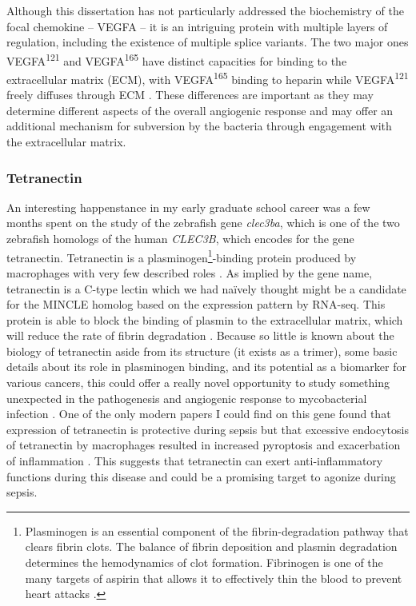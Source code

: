 Although this dissertation has not particularly addressed the biochemistry of the focal chemokine -- VEGFA -- it is an intriguing protein with multiple layers of regulation, including the existence of multiple splice variants. The two major ones VEGFA\textsuperscript{121} and VEGFA\textsuperscript{165} have distinct capacities for binding to the extracellular matrix (ECM), with VEGFA\textsuperscript{165} binding to heparin while VEGFA\textsuperscript{121} freely diffuses through ECM \citep{Fearnley2016, Shibuya2011}. These differences are important as they may determine different aspects of the overall angiogenic response and may offer an additional mechanism for subversion by the bacteria through engagement with the extracellular matrix. 

\subsubsection{Tetranectin}\label{clec3ba}

An interesting happenstance in my early graduate school career was a few months spent on the study of the zebrafish gene \textit{clec3ba}, which is one of the two zebrafish homologs of the human \textit{CLEC3B}, which encodes for the gene tetranectin. Tetranectin is a plasminogen\footnote{Plasminogen is an essential component of the fibrin\hyp{}degradation pathway that clears fibrin clots. The balance of fibrin deposition and plasmin degradation determines the hemodynamics of clot formation. Fibrinogen is one of the many targets of aspirin that allows it to effectively thin the blood to prevent heart attacks \citep{Bjornsson1989, Keragala2021}.}\hyp{}binding protein produced by macrophages with very few described roles \citep{Nielsen1993}. As implied by the gene name, tetranectin is a C\hyp{}type lectin which we had na\"{i}vely thought might be a candidate for the MINCLE homolog based on the expression pattern by RNA\hyp{}seq. This protein is able to block the binding of plasmin to the extracellular matrix, which will reduce the rate of fibrin degradation \citep{Mogues2004}. Because so little is known about the biology of tetranectin aside from its structure (it exists as a trimer), some basic details about its role in plasminogen binding, and its potential as a biomarker for various cancers, this could offer a really novel opportunity to study something unexpected in the pathogenesis and angiogenic response to mycobacterial infection \citep{Holtet1997, Nielsen1997, Graversen1998}. One of the only modern papers I could find on this gene found that expression of tetranectin is protective during sepsis but that excessive endocytosis of tetranectin by macrophages resulted in increased pyroptosis and exacerbation of inflammation \citep{Chen2020}. This suggests that tetranectin can exert anti\hyp{}inflammatory functions during this disease and could be a promising target to agonize during sepsis.

